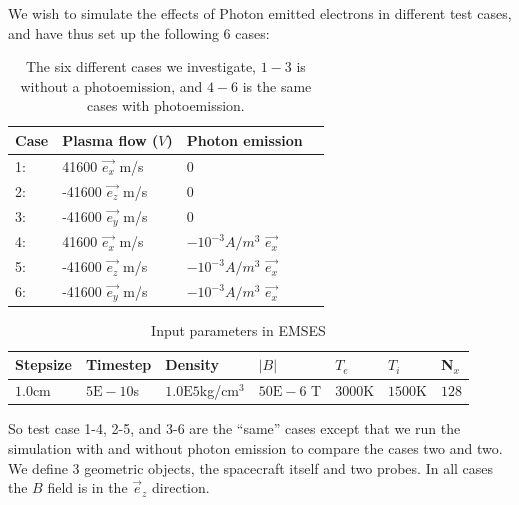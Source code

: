 We wish to simulate the effects of Photon emitted electrons in different test cases, and have thus set up the following
6 cases:
\begin{table}
\begin{center}
    \begin{tabular}{ | l | l | l | p{5cm} |}
    \hline
    Case & Plasma flow (\(V\)) & Photon emission  \\ \hline
     1: & 41600 $\vec{e_x}$ m/s  & 0 \\ \hline
     2: & -41600 $\vec{e_z}$ m/s & 0 \\ \hline
     3: & -41600 $\vec{e_y}$ m/s & 0 \\ \hline
     4: & 41600 $\vec{e_x}$ m/s & $-10^{-3} A/m^{3}$ $\vec{e_x}$\\ \hline
     5: & -41600 $\vec{e_z}$ m/s & $-10^{-3} A/m^{3}$ $\vec{e_x}$\\ \hline
     6: & -41600 $\vec{e_y}$ m/s & $-10^{-3} A/m^{3}$  $\vec{e_x}$\\
    \hline
    \end{tabular}
\end{center}
	\caption{The six different cases we investigate, \(1-3\) is without a photoemission, and \(4-6\) is the same cases with photoemission.}
\end{table}

	\begin{table}[h]
		\centering
	    \begin{tabular}{ | l | l | l| l| l | l | l |}
	    \hline
		Stepsize & Timestep & Density &\(|B|\) & \(T_e\) & \(T_i\) & N\(_x\)\\
		\hline
		\(1.0\)cm & \(5\text{E}-10\)s & \(1.0\text{E}5\)kg/cm\(^3\) &  \(50\text{E}-6\) T & \(3000\)K & \(1500\)K  & \(128\)\\
	    \hline
	    \end{tabular}
		\caption{Input parameters in EMSES}
	\end{table}

So test case 1-4, 2-5, and 3-6 are the ``same'' cases except that we run the simulation with and without
photon emission to compare the cases two and two. We define 3 geometric objects, the spacecraft itself
and two probes. In all cases the $B$ field is in the $\vec e_z$ direction.


